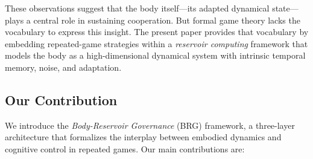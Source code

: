 \documentclass[11pt,a4paper]{article}
\theoremstyle{definition}
\begin{document}
These observations suggest that the body itself---its adapted dynamical
state---plays a central role in sustaining cooperation.  But formal game theory
lacks the vocabulary to express this insight.  The present paper provides that
vocabulary by embedding repeated-game strategies within a \emph{reservoir computing}
framework \citep{jaeger2001, lukovsevivcius2009} that models the body as a
high-dimensional dynamical system with intrinsic temporal memory, noise, and
adaptation.

\subsection{Our Contribution}

We introduce the \emph{Body-Reservoir Governance} (BRG) framework, a three-layer
architecture that formalizes the interplay between embodied dynamics and cognitive
control in repeated games.  Our main contributions are:
\end{document}
